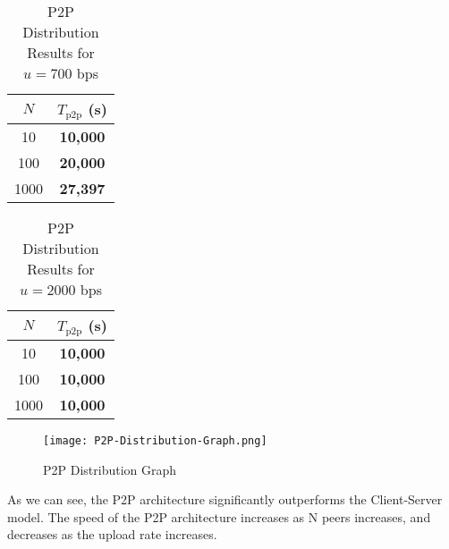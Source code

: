 \documentclass{article}
\begin{document}
\begin{table}[H]
  \centering
  \setlength{\tabcolsep}{8pt}
  \begin{tabular}{|c|c|}
    \hline
    \(N\) & \(T_{\text{p2p}}\) (s) \\ \hline
    10    & \textbf{10,000}      \\ \hline
    100   & \textbf{20,000}      \\ \hline
    1000  & \textbf{27,397}      \\ \hline
  \end{tabular}
  \caption{P2P Distribution Results for \(u = 700\) bps}
  \label{tab:p2p_700bps}
\end{table}

\begin{table}[H]
  \centering
  \setlength{\tabcolsep}{8pt}
  \begin{tabular}{|c|c|}
    \hline
    \(N\) & \(T_{\text{p2p}}\) (s) \\ \hline
    10    & \textbf{10,000}      \\ \hline
    100   & \textbf{10,000}      \\ \hline
    1000  & \textbf{10,000}      \\ \hline
  \end{tabular}
  \caption{P2P Distribution Results for \(u = 2000\) bps}
  \label{tab:p2p_2000bps}
\end{table}

\begin{figure}[H]
  \centering
  \texttt{[image: P2P-Distribution-Graph.png]}
  \caption{P2P Distribution Graph}
  \label{fig:p2p_graph}
\end{figure}

As we can see, the P2P architecture significantly outperforms the Client-Server model. The speed of the P2P architecture increases as N peers increases, and decreases as the upload rate increases.
\end{document}

